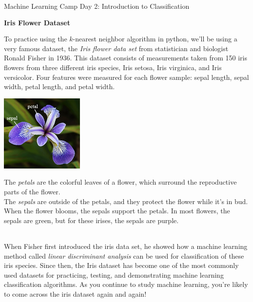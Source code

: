 \documentclass[10pt]{article}
\newcommand{\headerclass}{Machine Learning Camp}
\newcommand{\headersection}{Day 2: Introduction to Classification}
\newcommand{\headertitle}{Iris Flower Dataset}
\begin{document}
\headerclass\xspace {} \headersection\\
\begin{center}{ \large \textbf{\headertitle} }\end{center}

To practice using the $k$-nearest neighbor algorithm in python, we'll be using a very famous dataset, the \emph{Iris flower data set} from statistician and biologist Ronald Fisher in 1936. This dataset consists of measurements taken from 150 iris flowers from three different iris species, Iris setosa, Iris virginica, and Iris versicolor. Four features were measured for each flower sample: sepal length, sepal width, petal length, and petal width.\\

\begin{minipage}{.5\textwidth}
\begin{center}
\includegraphics[height = 1.5in]{iris_with_labels}
\end{center}
\end{minipage}
\begin{minipage}{.5\textwidth}
The \emph{petals} are the colorful leaves of a flower, which surround the reproductive parts of the flower.\\

The \emph{sepals} are outside of the petals, and they protect the flower while it's in bud. When the flower blooms, the sepals support the petals. In most flowers, the sepals are green, but for these irises, the sepals are purple.
\end{minipage}\\

When Fisher first introduced the iris data set, he showed how a machine learning method called \emph{linear discriminant analysis} can be used for classification of these iris species. Since then, the Iris dataset has become one of the most commonly used datasets for practicing, testing, and demonstrating machine learning classification algorithms. As you continue to study machine learning, you're likely to come across the iris dataset again and again!
\end{document}
